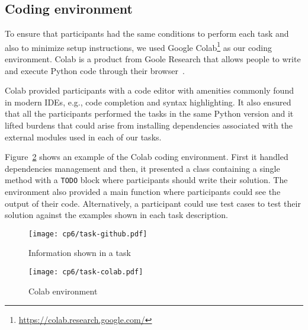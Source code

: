 



\subsection{Coding environment}
\label{cp6:coding-environment}



To ensure that participants had the same conditions to perform each task
and also to minimize setup instructions, we used Google Colab\footnote{\url{https://colab.research.google.com/}} as our coding environment. 
Colab is a product from Goole Research that allows people to write and execute Python code through their browser~\cite{google-colab}. 



Colab provided participants with a code editor with amenities commonly found in modern IDEs, e.g., code completion and syntax highlighting. It also ensured that all the participants 
performed the tasks in the same Python version and it lifted 
burdens that could arise from installing dependencies associated with the external modules used in each of our tasks. 


Figure~\ref{fig:nytimes-task-colab} shows an example of the Colab coding environment. 
First it handled dependencies management and then, 
it presented a class containing a single method with a \texttt{TODO} block where 
participants should write their solution. 
The environment also provided a main function where participants could see the output
of their code. Alternatively, a participant could use test cases to test their solution
against the examples shown in each task description.









\clearpage

\begin{figure}
    \centering
    \texttt{[image: cp6/task-github.pdf]}
    \caption{Information shown in a task}
    \label{fig:nytimes-task-github}
\end{figure}



\clearpage

\begin{figure}
    \centering
    \texttt{[image: cp6/task-colab.pdf]}
    \caption{Colab environment}
    \label{fig:nytimes-task-colab}
\end{figure}



